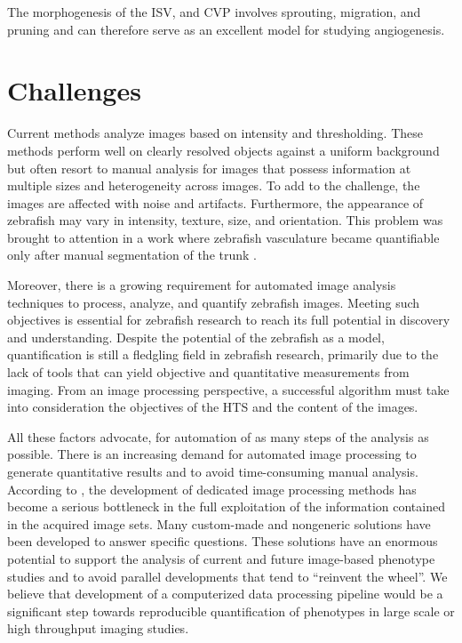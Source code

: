 The morphogenesis of the ISV, and CVP involves sprouting, migration, and pruning and can therefore serve as an excellent model for studying angiogenesis.

\section{Challenges}


Current methods analyze images based on intensity and thresholding. These methods perform well on clearly resolved objects against a uniform background but often resort to manual analysis for images that possess information at multiple sizes and heterogeneity across images. To add to the challenge, the images are affected with noise and artifacts. Furthermore, the appearance of zebrafish may vary in intensity, texture, size, and orientation. This problem was brought to attention in a work where zebrafish vasculature became quantifiable only after manual segmentation of the trunk \cite{Tran07}.

Moreover, there is a growing requirement for automated image analysis techniques to process, analyze, and quantify zebrafish images. Meeting such objectives is essential for zebrafish research to reach its full potential in discovery and understanding. Despite the potential of the zebrafish as a model, quantification is still a fledgling field in zebrafish research, primarily due to the lack of tools that can yield objective and quantitative measurements from imaging. From an image processing perspective, a successful algorithm must take into consideration the objectives of the HTS and the content of the images.

All these factors advocate, for automation of as many steps of the analysis as possible. There is an increasing demand for automated image processing to generate quantitative results and to avoid time-consuming manual analysis. According to \cite{Ron13}, the development of dedicated image processing methods has become a serious bottleneck in the full exploitation of the information contained in the acquired image sets. Many custom-made and nongeneric solutions have been developed to answer specific questions. These solutions have an enormous potential to support the analysis of current and future image-based phenotype studies and to avoid parallel developments that tend to \textquotedblleft reinvent the wheel\textquotedblright. We believe that development of a computerized data processing pipeline would be a significant step towards reproducible quantification of phenotypes in large scale or high throughput imaging studies.

